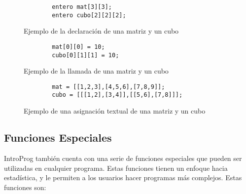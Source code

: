 \begin{figure}[!htbp]
    \centering
    
    \begin{lstlisting}
        entero mat[3][3];
        entero cubo[2][2][2];

    \end{lstlisting}
    \caption{Ejemplo de la declaración de una matriz y un cubo}
\end{figure}
\FloatBarrier

\begin{figure}[!htbp]
    \centering
    
    \begin{lstlisting}
        mat[0][0] = 10;
        cubo[0][1][1] = 10;

    \end{lstlisting}
    \caption{Ejemplo de la llamada de una matriz y un cubo}
\end{figure}
\FloatBarrier

\begin{figure}[!htbp]
    \centering
    
    \begin{lstlisting}
        mat = [[1,2,3],[4,5,6],[7,8,9]];
        cubo = [[[1,2],[3,4]],[[5,6],[7,8]]];

    \end{lstlisting}
    \caption{Ejemplo de una asignación textual de una matriz y un cubo}
\end{figure}
\FloatBarrier






\FloatBarrier
\subsection{Funciones Especiales}

IntroProg también cuenta con una serie de funciones especiales que pueden ser utilizadas en cualquier programa. Estas funciones tienen un enfoque hacia estadística, y le permiten a los usuarios hacer programas más complejos. Estas funciones son:


